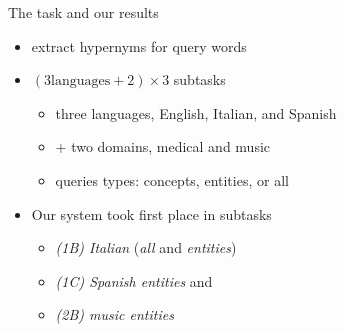 \documentclass{beamer}
\newlength{\sepwid}
\newlength{\onecolwid}
\newlength{\twocolwid}
\begin{document}
\begin{frame}[t]
\begin{columns}[t]
\begin{column}{\onecolwid}
      \begin{block}{The task and our results}
        \begin{itemize}
          \item extract hypernyms for query words \\ \cite{Camacho-Collados:2018}
          \item $(3\text{languages}+2)\times 3$ subtasks
            \begin{itemize}
              \item three languages, English, Italian, and Spanish 
              \item  + two domains, medical and music
              \item queries \alert{types}: concepts, entities, or all
            \end{itemize}
          \item Our system took first place in subtasks
            \begin{itemize}
              \item \emph{(1B) Italian} (\emph{all} and \emph{entities})
              \item \emph{(1C) Spanish entities} and
              \item \emph{(2B) music entities}
            \end{itemize}
        \end{itemize}
      \end{block}

    \end{column}

\begin{column}{\sepwid} %
\end{column}

  \begin{column}{\onecolwid}


\end{column}
\end{columns}
\end{frame}
\end{document}
